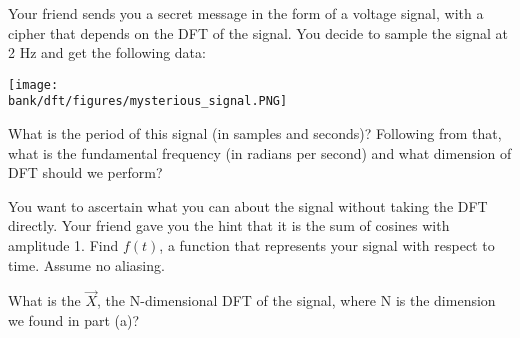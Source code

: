 
Your friend sends you a secret message in the form of a voltage signal, with a cipher that depends on the DFT of the signal. You decide to sample the signal at 2 Hz and get the following data:
\newline
\begin{center}
    \texttt{[image: \\bank/dft/figures/mysterious\_signal.PNG]} 
\end{center}

\begin{enumerate}
    \qitem What is the period of this signal (in samples and seconds)? Following from that, what is the fundamental frequency (in radians per second) and what dimension of DFT should we perform?


    \qitem You want to ascertain what you can about the signal without taking the DFT directly. Your friend gave you the hint that it is the sum of cosines with amplitude 1. Find $f(t)$, a function that represents your signal with respect to time. Assume no aliasing.


    \qitem What is the $\vec{X}$, the N-dimensional DFT of the signal, where N is the dimension we found in part (a)?


\end{enumerate}
